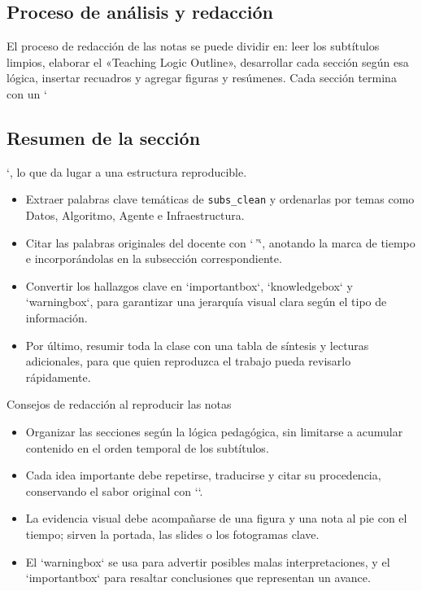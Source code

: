 \documentclass[a4paper]{article}
\begin{document}
\subsection{Proceso de análisis y redacción}
El proceso de redacción de las notas se puede dividir en: leer los subtítulos limpios, elaborar el «Teaching Logic Outline», desarrollar cada sección según esa lógica, insertar recuadros y agregar figuras y resúmenes. Cada sección termina con un `\subsection{Resumen de la sección}`, lo que da lugar a una estructura reproducible.
\begin{itemize}
    \item Extraer palabras clave temáticas de \texttt{subs\_clean} y ordenarlas por temas como Datos, Algoritmo, Agente e Infraestructura.
    \item Citar las palabras originales del docente con `\textit{''}`, anotando la marca de tiempo e incorporándolas en la subsección correspondiente.
    \item Convertir los hallazgos clave en `importantbox`, `knowledgebox` y `warningbox`, para garantizar una jerarquía visual clara según el tipo de información.
    \item Por último, resumir toda la clase con una tabla de síntesis y lecturas adicionales, para que quien reproduzca el trabajo pueda revisarlo rápidamente.
\end{itemize}
\begin{knowledgebox}{Consejos de redacción al reproducir las notas}
\begin{itemize}
    \item Organizar las secciones según la lógica pedagógica, sin limitarse a acumular contenido en el orden temporal de los subtítulos.
    \item Cada idea importante debe repetirse, traducirse y citar su procedencia, conservando el sabor original con `\textit{}`.
    \item La evidencia visual debe acompañarse de una figura y una nota al pie con el tiempo; sirven la portada, las slides o los fotogramas clave.
    \item El `warningbox` se usa para advertir posibles malas interpretaciones, y el `importantbox` para resaltar conclusiones que representan un avance.
\end{itemize}
\end{knowledgebox}
\end{document}
